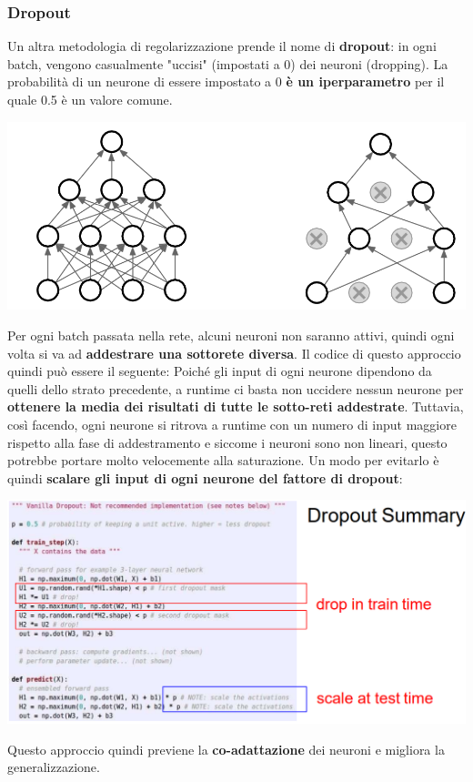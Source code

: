 \documentclass[12pt]{article}
\begin{document}
\subsubsection{Dropout}
Un altra metodologia di regolarizzazione prende il nome di \textbf{dropout}: in ogni batch, vengono casualmente "uccisi" (impostati a 0) dei neuroni (dropping). La probabilità di un neurone di essere impostato a 0
\textbf{è un iperparametro} per il quale 0.5 è un valore comune.
\begin{center}
    \includegraphics[width =0.90\linewidth]{Images/178.PNG}
\end{center}
Per ogni batch passata nella rete, alcuni neuroni non saranno attivi, quindi ogni volta si va ad \textbf{addestrare una sottorete diversa}. 
Il codice di questo approccio quindi può essere il seguente:
Poiché gli input di ogni neurone dipendono da quelli dello strato precedente, a runtime ci basta non uccidere nessun neurone per \textbf{ottenere la media dei risultati di tutte le sotto-reti addestrate}.
Tuttavia, così facendo, ogni neurone si ritrova a runtime con un numero di input maggiore rispetto alla fase di addestramento e siccome i neuroni sono non lineari, questo potrebbe portare molto velocemente alla saturazione.
Un modo per evitarlo è quindi \textbf{scalare gli input di ogni neurone del fattore di dropout}:
\begin{center}
    \includegraphics[width =1\linewidth]{Images/179.PNG}
\end{center}
Questo approccio quindi previene la \textbf{co-adattazione} dei neuroni e migliora la generalizzazione.
\newpage
\end{document}
